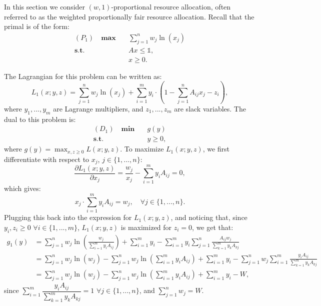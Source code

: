 \documentclass[11pt]{article}
\begin{document}
In this section we consider $(w, 1)$-proportional resource allocation, often referred to as the weighted proportionally fair resource allocation. Recall that the primal is of the form:
\begin{align*}
{(P_1)}\quad\textbf{max} \quad&\sum_{j=1}^n w_j\ln(x_j)\\
\textbf{s.t.}\quad& Ax \leq \mathds{1},\\
&x\geq 0.
\end{align*}

The Lagrangian for this problem can be written as:
\begin{equation*}
L_1(x; y, z) = \sum_{j=1}^n w_j \ln(x_j) + \sum_{i=1}^m y_i\cdot\left(1 - \sum_{j=1}^n A_{ij} x_j -z_i\right),
\end{equation*}
where $y_1,..., y_m$ are Lagrange multipliers, and $z_1, ..., z_m$ are slack variables. The dual to this problem is:
\begin{align*}
{(D_1)}\quad\textbf{min} \quad&g(y)\\
\textbf{s.t.}\quad& y\geq 0,
\end{align*}
where $g(y) = \max_{x, z \geq 0} L(x; y, z)$. To maximize $L_1(x; y, z)$, we first differentiate with respect to $x_j$, $j\in\{1,...,n\}$:
\begin{equation*}
\frac{\partial L_1(x; y, z)}{\partial x_j}=\frac{w_j}{x_j}-\sum_{i=1}^{m}y_i A_{ij}=0,
\end{equation*}
which gives:
\begin{equation}\label{eq:primal-dual-relation}
x_j\cdot\sum_{i=1}^m y_i A_{ij} = w_j, \quad\forall j\in \{1,...,n\}.
\end{equation}
Plugging this back into the expression for $L_1(x; y, z)$, and noticing that, since $y_i, z_i\geq 0$ $ \forall i\in\{1,...,m\}$, $L_1(x; y, z)$ is maximized for $z_i=0$, we get that:
\begin{align*}
g_1(y) &= \sum_{j=1}^n w_j\ln\left(\frac{w_j}{\sum_{i=1}^my_i A_{ij}}\right)+\sum_{i=1}^m y_i-\sum_{i=1}^m y_i \sum_{j=1}^n \frac{A_{ij}w_j}{\sum_{k=1}^my_kA_{kj}}\\
&=\sum_{j=1}^nw_j\ln(w_j) - \sum_{j=1}^n w_j \ln\left(\sum_{i=1}^m y_i A_{ij}\right)+\sum_{i=1}^m y_i -\sum_{j=1}^n w_j \sum_{i=1}^m \frac{y_i A_{ij}}{\sum_{k=1}^my_kA_{kj}} \\
&=\sum_{j=1}^nw_j\ln(w_j) - \sum_{j=1}^n w_j \ln\left(\sum_{i=1}^m y_i A_{ij}\right)+\sum_{i=1}^m y_i -W,
\end{align*}
since $\sum_{i=1}^m \dfrac{y_i A_{ij}}{\sum_{k=1}^my_kA_{kj}} = 1$ $\forall j\in\{1,...,n\}$, and $\sum_{j=1}^n w_j = W$.
\end{document}
